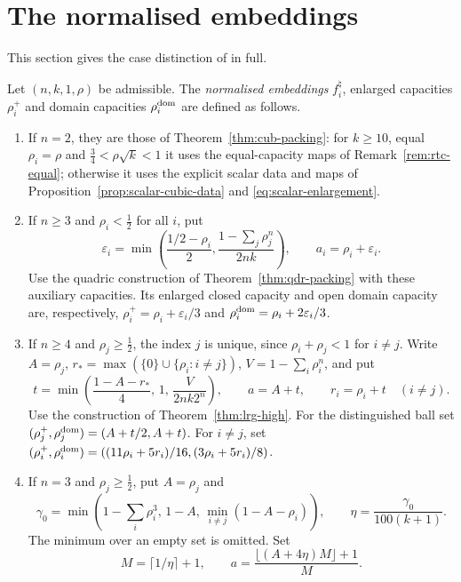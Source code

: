 \section{The normalised embeddings}\label{sec:brd}

This section gives the case distinction of  in full.

\begin{construction}\label{cons:ham-branch}
Let $(n,k,1,\rho)$ be admissible. The \emph{normalised embeddings} $f^\natural_i$, enlarged capacities $\rho_i^+$ and domain capacities
$\rho_i^{\rm dom}$ are defined as follows.
\begin{enumerate}[label=(\roman*)]
\item If $n=2$, they are those of Theorem~\ref{thm:cub-packing}: for $k\ge10$, equal $\rho_i=\rho$ and
 $\frac34<\rho\sqrt k<1$ it uses the equal-capacity maps of Remark~\ref{rem:rtc-equal}; otherwise it uses the explicit
 scalar data and maps of Proposition~\ref{prop:scalar-cubic-data} and \eqref{eq:scalar-enlargement}.
\item If $n\ge3$ and $\rho_i<\frac12$ for all $i$, put
 \[
  \varepsilon_i=\min\left(\frac{1/2-\rho_i}{2},
             \frac{1-\sum_j\rho_j^n}{2nk}\right),\qquad a_i=\rho_i+\varepsilon_i.
 \]
 Use the quadric construction of Theorem~\ref{thm:qdr-packing} with these auxiliary capacities.
 Its enlarged closed capacity and open domain capacity are, respectively,
 $\rho_i^+=\rho_i+\varepsilon_i/3$ and $\rho_i^{\rm dom}=\rho_i+2\varepsilon_i/3$.
\item If $n\ge4$ and $\rho_j\ge\frac12$, the index $j$ is unique, since $\rho_i+\rho_j<1$ for $i\ne j$. Write $A=\rho_j$,
 $r_*=\max(\{0\}\cup\{\rho_i:i\ne j\})$, $V=1-\sum_i\rho_i^n$, and put
 \[
 t=\min\left(\frac{1-A-r_*}{4},\,1,\,\frac{V}{2nk2^n}\right),\qquad
 a=A+t,\qquad r_i=\rho_i+t\quad(i\ne j).
 \]
 Use the construction of Theorem~\ref{thm:lrg-high}. For the distinguished ball set
 $(\rho_j^+,\rho_j^{\rm dom})=(A+t/2,A+t)$. For $i\ne j$, set
 $(\rho_i^+,\rho_i^{\rm dom})=((11\rho_i+5r_i)/16,(3\rho_i+5r_i)/8)$.
\item If $n=3$ and $\rho_j\ge\frac12$, put $A=\rho_j$ and
 \[
 \gamma_0=\min\left(1-\sum_i\rho_i^3,\,1-A,\,
                    \min_{i\ne j}(1-A-\rho_i)\right),\qquad
 \eta=\frac{\gamma_0}{100(k+1)}.
 \]
 The minimum over an empty set is omitted. Set
 \[
 M=\lceil1/\eta\rceil+1,\qquad
 a=\frac{\lfloor(A+4\eta)M\rfloor+1}{M}.
\]
\end{enumerate}
\end{construction}
